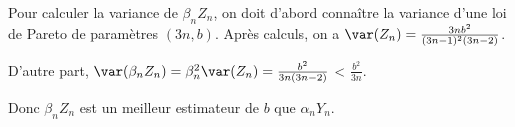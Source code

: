 {\begin{enumerate}
{        Pour calculer la variance de $\beta_n Z_n$, on doit d'abord connaître la variance d'une loi de Pareto de paramètres $(3n, b)$. Après calculs, on a $\var(Z_n) = \frac{3nb^2}{(3n-1)^2(3n-2)}$. 
        
        D'autre part,  $\var(\beta_n Z_n) = \beta_n^2 \var(Z_n) = \frac{b^2}{3n(3n-2)}$ < $\frac{b^2}{3n}$. 

        Donc $\beta_n Z_n$ est un meilleur estimateur de $b$ que $\alpha_n Y_n$.
    }
\end{enumerate}

}